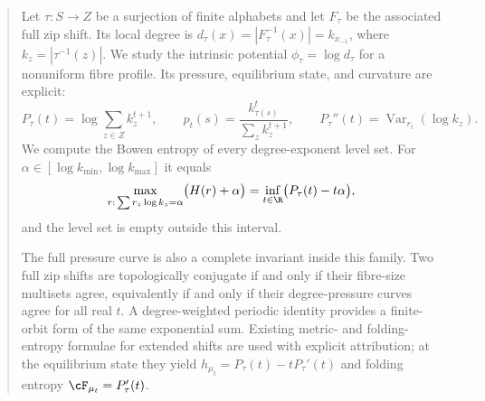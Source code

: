 \begin{abstract}
Let $\tau:S\to Z$ be a surjection of finite alphabets and let $F_\tau$ be
the associated full zip shift.  Its local degree is
$d_\tau(x)=|F_\tau^{-1}(x)|=k_{x_{-1}}$, where
$k_z=|\tau^{-1}(z)|$.  We study the intrinsic potential
$\phi_\tau=\log d_\tau$ for a nonuniform fibre profile.  Its pressure,
equilibrium state, and curvature are explicit:
\[
 P_\tau(t)=\log\sum_{z\in Z}k_z^{t+1},\qquad
 p_t(s)=\frac{k_{\tau(s)}^t}{\sum_z k_z^{t+1}},\qquad
 P_\tau''(t)=\operatorname{Var}_{r_t}(\log k_z).
\]
We compute the Bowen entropy of every degree-exponent level set.  For
$\alpha\in[\log k_{\min},\log k_{\max}]$ it equals
\[
 \max_{r:\,\sum r_z\log k_z=\alpha}\bigl(H(r)+\alpha\bigr)
 =\inf_{t\in\R}\bigl(P_\tau(t)-t\alpha\bigr),
\]
and the level set is empty outside this interval.

The full pressure curve is also a complete invariant inside this family.
Two full zip shifts are topologically conjugate if and only if their fibre-size
multisets agree, equivalently if and only if their degree-pressure curves
agree for all real $t$.  A degree-weighted periodic identity provides a
finite-orbit form of the same exponential sum.  Existing metric- and
folding-entropy formulae for extended shifts are used with explicit
attribution; at the equilibrium state they yield
$h_{\mu_t}=P_\tau(t)-tP_\tau'(t)$ and folding entropy
$\cF_{\mu_t}=P_\tau'(t)$.
\end{abstract}
